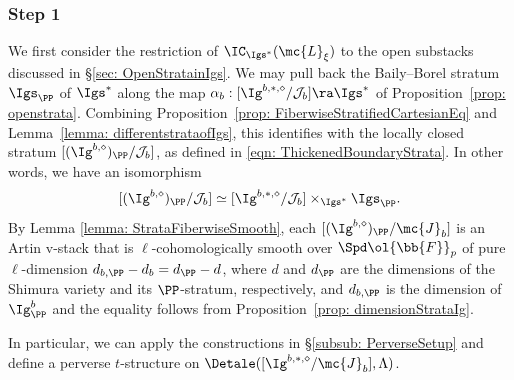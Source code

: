 \documentclass[letterpaper,11pt]{amsart}
\begin{document}
\subsubsection{Step 1} We first consider the restriction of $\IC_{\Igs^\ast}(\mc{L}_\xi)$ to the open substacks discussed in \S \ref{sec: OpenStratainIgs}. We may pull back the Baily--Borel stratum $\Igs_\PP$ of $\Igs^{*}$ along the map $\alpha_{b}: [\Ig^{b,*,\diamond}/\mathcal{J}_{b}] \ra \Igs^{*}$ of Proposition~\ref{prop: openstrata}. Combining Proposition~\ref{prop: FiberwiseStratifiedCartesianEq} and Lemma~\ref{lemma: differentstrataofIgs}, this identifies with the locally closed stratum $[(\Ig^{b,\diamond})_{\PP}/\mathcal{J}_{b}]$, as defined in \eqref{eqn: ThickenedBoundaryStrata}. In other words, we have an isomorphism 
\begin{equation}{\label{eqn: PullingBackStrata}}
 [(\Ig^{b,\diamond})_{\PP}/\mathcal{J}_{b}] \simeq [\Ig^{b,\ast,\diamond}/\mathcal{J}_{b}] \times_{\Igs^\ast} \Igs_{\PP}.  
\end{equation}
By Lemma \ref{lemma: StrataFiberwiseSmooth}, each $[(\Ig^{b,\diamond})_\PP/\mc{J}_b]$ is an Artin v-stack that is $\ell$-cohomologically smooth over $\Spd \ol{\bb{F}}_p$ of pure $\ell$-dimension $d_{b,\PP} - d_{b} = d_{\PP} -d$, where $d$ and $d_\PP$ are the dimensions of the Shimura variety and its $\PP$-stratum, respectively, and $d_{b,\PP}$ is the dimension of $\Ig^{b}_{\PP}$ and the equality follows from Proposition~\ref{prop: dimensionStrataIg}.

In particular, we can apply the constructions in \S\ref{subsub: PerverseSetup} and define a perverse $t$-structure on $\Detale([\Ig^{b,\ast,\diamond}/\mc{J}_b],\Lambda)$.  
\end{document}
